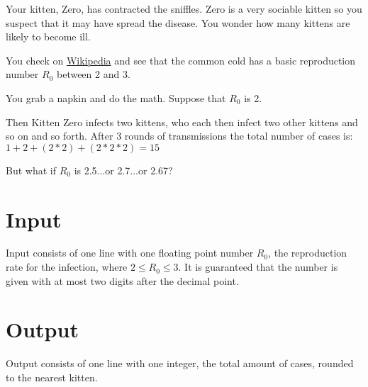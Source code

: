 
Your kitten, Zero, has contracted the sniffles.
Zero is a very sociable kitten so you suspect that it may have spread the disease.
You wonder how many kittens are likely to become ill.

You check on \href{https://en.wikipedia.org/wiki/Basic_reproduction_number}{Wikipedia}
and see that the common cold has a basic reproduction number $R_0$ between 2 and 3.

You grab a napkin and do the math.
Suppose that $R_0$ is 2.

Then Kitten Zero infects two kittens, who each then infect two other kittens and so on and so forth.
After 3 rounds of transmissions the total number of cases is:
$1 + 2 + (2*2) + (2*2*2) = 15$

But what if $R_0$ is 2.5...or 2.7...or 2.67?

\section*{Input}
Input consists of one line with one floating point number $R_0$, the reproduction rate for the infection,
where $2 \leq R_0 \leq 3$. It is guaranteed that the number is given with at most two digits after the decimal point.

\section*{Output}
Output consists of one line with one integer, the total amount of cases, rounded to the nearest kitten.
